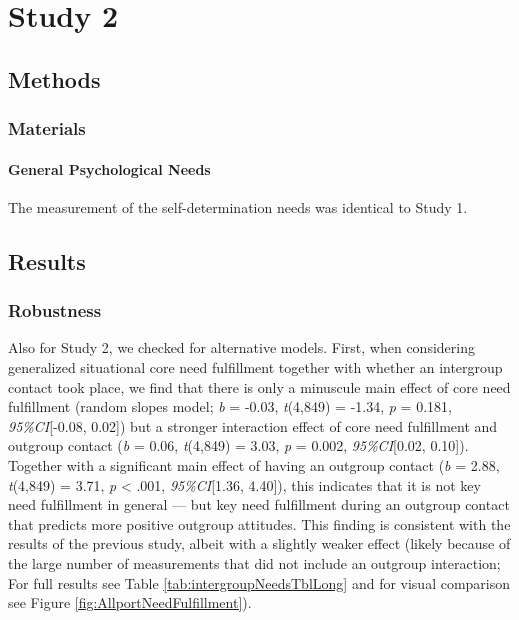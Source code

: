 \section{Study 2}

\subsection{Methods}

\subsubsection{Materials}

\paragraph{General Psychological Needs}

The measurement of the self-determination needs was identical to Study
1.

\subsection{Results}

\subsubsection{Robustness}

Also for Study 2, we checked for alternative models. First, when
considering generalized situational core need fulfillment together with
whether an intergroup contact took place, we find that there is only a
minuscule main effect of core need fulfillment (random slopes model;
\textit{b} = -0.03, \textit{t}(4,849) = -1.34, \textit{p} = 0.181,
\textit{95\%CI}{[}-0.08, 0.02{]}) but a stronger interaction effect of
core need fulfillment and outgroup contact (\textit{b} = 0.06,
\textit{t}(4,849) = 3.03, \textit{p} = 0.002, \textit{95\%CI}{[}0.02,
0.10{]}). Together with a significant main effect of having an outgroup
contact (\textit{b} = 2.88, \textit{t}(4,849) = 3.71, \textit{p}
\textless{} .001, \textit{95\%CI}{[}1.36, 4.40{]}), this indicates that
it is not key need fulfillment in general --- but key need fulfillment
during an outgroup contact that predicts more positive outgroup
attitudes. This finding is consistent with the results of the previous
study, albeit with a slightly weaker effect (likely because of the large
number of measurements that did not include an outgroup interaction; For
full results see Table \ref{tab:intergroupNeedsTblLong} and for visual
comparison see Figure \ref{fig:AllportNeedFulfillment}).

